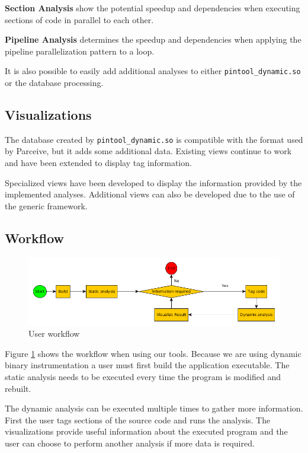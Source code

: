 \textbf{Section Analysis} show the potential speedup and dependencies when executing sections of code in parallel to each other.

\textbf{Pipeline Analysis} determines the speedup and dependencies when applying the pipeline parallelization pattern to a loop.

It is also possible to easily add additional analyses to either \texttt{pintool\_dynamic.so} or the database processing.

\subsection{Visualizations}

The database created by \texttt{pintool\_dynamic.so} is compatible with the format used by Parceive, but it adds some additional data. Existing views continue to work and have been extended to display tag information.

Specialized views have been developed to display the information provided by the implemented analyses. Additional views can also be developed due to the use of the generic framework.

\subsection{Workflow}

\begin{figure}
	\centering
	\includegraphics[width=1\textwidth]{workflow}
	\caption{User workflow}
	\label{cap3:workflow}
\end{figure}

Figure \ref{cap3:workflow} shows the workflow when using our tools.  Because we are using dynamic binary instrumentation a user must first build the application executable. The static analysis needs to be executed every time the program is modified and rebuilt.

The dynamic analysis can be executed multiple times to gather more information. First the user tags sections of the source code and runs the analysis. The visualizations provide useful information about the executed program and the user can choose to perform another analysis if more data is required.

